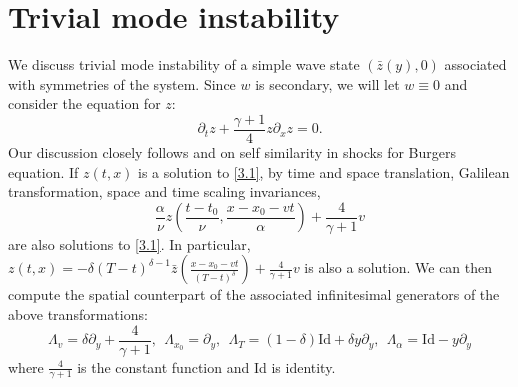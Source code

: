 \documentclass{article}
\newcommand{\ga}{\gamma}
\newcommand{\al}{\alpha}
\newcommand{\pa}{\partial}
\def\be{\begin{equation}}
\def\ee{\end{equation}}
\numberwithin{equation}{section}
\begin{document}
\section{Trivial mode instability}\label{eigenvalue subsection}
We discuss trivial mode instability of a simple wave state $(\bar z(y), 0)$ associated with symmetries of the system. 
Since $w$ is secondary, we will let $w\equiv 0$ and consider 
the equation for $z$: 
\be\label{3.1}
    \pa_t z + \frac{\ga+1}{4}z\pa_x z =0. 
\ee
Our discussion closely follows \cite{CGN18} and \cite{EF00} on self similarity in shocks for Burgers equation. 
If $z(t,x)$ is a solution to \eqref{3.1}, by time and space translation, Galilean transformation, space and time scaling invariances, 
\be
    \frac{\al}{\nu} z(\frac{t-t_0}{\nu}, \frac{x-x_0-vt}{\al})+\frac{4}{\ga+1} v
\ee
are also solutions to \eqref{3.1}. In particular, $z(t,x) = -\delta(T-t)^{\delta-1} \bar z (\frac{x-x_0-vt}{(T-t)^\delta}) + \frac{4}{\ga+1} v$ is also a solution. 
We can then compute the spatial counterpart of the associated infinitesimal generators of the above transformations:
\be
    \Lambda_{v}= \delta \pa_y  +\frac{4}{\ga+1},\ \ \Lambda_{x_0} = \pa_y , \ \ \Lambda_{T} = (1-\delta)\text{Id} + \delta y \pa_y,\ \ \Lambda_{\al} = \text{Id} - y\pa_y
\ee
where $\frac{4}{\ga+1}$ is the constant function and Id is identity. 
\end{document}
